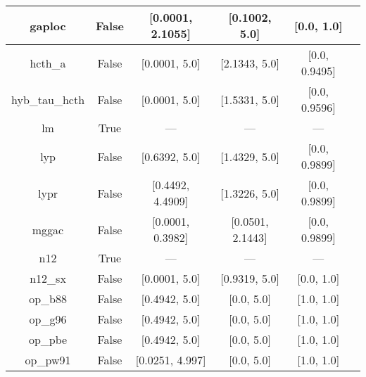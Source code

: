 \begin{tabular}{|c|c|c|c|c|l|}
        gaploc &                 False & [0.0001, 2.1055] &    [0.1002, 5.0] &       [0.0, 1.0] &                                        \cite{Fabiano2014_2016} \\ \hline
       hcth\_a &                 False &    [0.0001, 5.0] &    [2.1343, 5.0] &    [0.0, 0.9495] &                                      \cite{Hamprecht1998_6264} \\ \hline
hyb\_tau\_hcth &                 False &    [0.0001, 5.0] &    [1.5331, 5.0] &    [0.0, 0.9596] &                                          \cite{Boese2002_9559} \\ \hline
            lm &                  True &              --- &              --- &              --- &                             \cite{Langreth1981_446,Hu1985_391} \\ \hline
           lyp &                 False &    [0.6392, 5.0] &    [1.4329, 5.0] &    [0.0, 0.9899] &                            \cite{Lee1988_785,Miehlich1989_200} \\ \hline
          lypr &                 False & [0.4492, 4.4909] &    [1.3226, 5.0] &    [0.0, 0.9899] &                                             \cite{Ai2021_1207} \\ \hline
         mggac &                 False & [0.0001, 0.3982] & [0.0501, 2.1443] &    [0.0, 0.9899] &                                        \cite{Patra2019_155140} \\ \hline
           n12 &                  True &              --- &              --- &              --- &                                       \cite{Peverati2012_2310} \\ \hline
       n12\_sx &                 False &    [0.0001, 5.0] &    [0.9319, 5.0] &       [0.0, 1.0] &                                      \cite{Peverati2012_16187} \\ \hline
       op\_b88 &                 False &    [0.4942, 5.0] &       [0.0, 5.0] &       [1.0, 1.0] &                                       \cite{Tsuneda1999_10664} \\ \hline
       op\_g96 &                 False &    [0.4942, 5.0] &       [0.0, 5.0] &       [1.0, 1.0] &                      \cite{Tsuneda1999_10664,Tsuneda1999_5656} \\ \hline
       op\_pbe &                 False &    [0.4942, 5.0] &       [0.0, 5.0] &       [1.0, 1.0] &                      \cite{Tsuneda1999_10664,Tsuneda1999_5656} \\ \hline
      op\_pw91 &                 False &  [0.0251, 4.997] &       [0.0, 5.0] &       [1.0, 1.0] &                      \cite{Tsuneda1999_10664,Tsuneda1999_5656} \\ \hline

\end{tabular}
